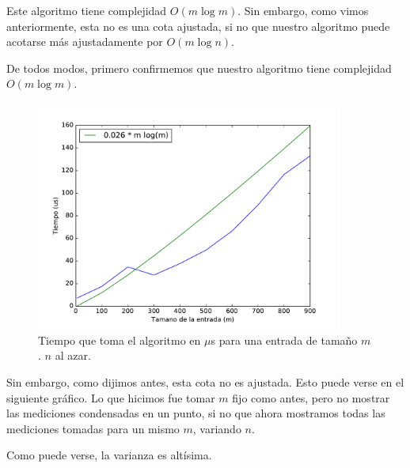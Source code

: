 

Este algoritmo tiene complejidad $O(m \log m)$. Sin embargo, como vimos anteriormente, esta no es una cota ajustada, si no que nuestro algoritmo puede acotarse más ajustadamente por $O(m \log n)$.

De todos modos, primero confirmemos que nuestro algoritmo tiene complejidad $O(m \log m)$.

\begin{figure}[H]
 \centering
	\includegraphics[width=0.9\textwidth]{img/exp/problema2-promedio.pdf}
	\caption{\footnotesize Tiempo que toma el algoritmo en $\mu$s para una entrada de tamaño $m$. $n$ al azar.}
	\label{fig:problema2-promedio}
\end{figure}

Sin embargo, como dijimos antes, esta cota no es ajustada. Esto puede verse en el siguiente gráfico. Lo que hicimos fue tomar $m$ fijo como antes, pero no mostrar las mediciones condensadas en un punto, si no que ahora mostramos todas las mediciones tomadas para un mismo $m$, variando $n$. 

Como puede verse, la varianza es altísima.

